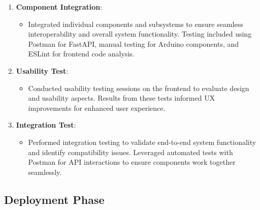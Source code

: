 \begin{enumerate}
    \item \textbf{Component Integration}:
    \begin{itemize}
        \item Integrated individual components and subsystems to ensure seamless interoperability and overall system functionality. Testing included using Postman for FastAPI, manual testing for Arduino components, and ESLint for frontend code analysis.
    \end{itemize}

\item \textbf{Usability Test}:
    \begin{itemize}
        \item Conducted usability testing sessions on the frontend to evaluate design and usability aspects. Results from these tests informed UX improvements for enhanced user experience.
    \end{itemize}

\item \textbf{Integration Test}:
    \begin{itemize}
        \item Performed integration testing to validate end-to-end system functionality and identify compatibility issues. Leveraged automated tests with Postman for API interactions to ensure components work together seamlessly.
    \end{itemize}

\end{enumerate}



\subsection{Deployment Phase}

